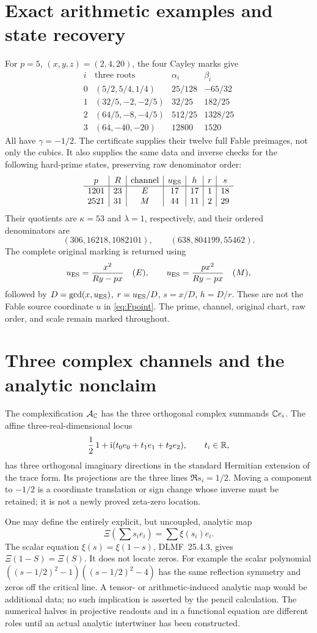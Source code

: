 \documentclass[11pt]{article}
\theoremstyle{remark}\newtheorem{remark}[theorem]{Remark}
\begin{document}
\section{Exact arithmetic examples and state recovery}
For $p=5$, $(x,y,z)=(2,4,20)$, the four Cayley marks give
\[
\begin{array}{c|c|c|c}
i&\text{three roots}&\alpha_i&\beta_i\\\hline
0&(5/2,5/4,1/4)&25/128&-65/32\\
1&(32/5,-2,-2/5)&32/25&182/25\\
2&(64/5,-8,-4/5)&512/25&1328/25\\
3&(64,-40,-20)&12800&1520
\end{array}
\]
All have $\gamma=-1/2$. The certificate supplies their twelve full Fable preimages, not only the cubics. It also supplies the same data and inverse checks for the following hard-prime states, preserving raw denominator order:
\[
\begin{array}{c|c|c|c|c|c|c}
p&R&\text{channel}&u_{\rm ES}&h&r&s\\\hline
1201&23&E&17&17&1&18\\
2521&31&M&44&11&2&29
\end{array}
\]
Their quotients are $\kappa=53$ and $\lambda=1$, respectively, and their ordered denominators are
\[
 (306,16218,1082101),\qquad(638,804199,55462).
\]
The complete original marking is returned using
\[
 u_{\rm ES}=\frac{x^2}{Ry-px}\quad(E),\qquad
 u_{\rm ES}=\frac{px^2}{Ry-px}\quad(M),
\]
followed by $D=\gcd(x,u_{\rm ES})$, $r=u_{\rm ES}/D$, $s=x/D$, $h=D/r$.
These are not the Fable source coordinate $u$ in \eqref{eq:Fpoint}.
The prime, channel, original chart, raw order, and scale remain marked throughout.

\section{Three complex channels and the analytic nonclaim}
The complexification $\mathcal A_\mathbb C$ has the three orthogonal complex summands $\mathbb C e_i$. The affine three-real-dimensional locus
\[
 \frac12\,1+\mathrm i(t_0e_0+t_1e_1+t_2e_2),\qquad t_i\in\mathbb R,
\]
has three orthogonal imaginary directions in the standard Hermitian extension of the trace form. Its projections are the three lines $\Re s_i=1/2$. Moving a component to $-1/2$ is a coordinate translation or sign change whose inverse must be retained; it is not a newly proved zeta-zero location.

One may define the entirely explicit, but uncoupled, analytic map
\[
 \Xi\left(\sum s_ie_i\right)=\sum \xi(s_i)e_i.
\]
The scalar equation $\xi(s)=\xi(1-s)$, DLMF~25.4.3, gives $\Xi(1-S)=\Xi(S)$. It does not locate zeros. For example the scalar polynomial $((s-1/2)^2-1)((s-1/2)^2-4)$ has the same reflection symmetry and zeros off the critical line. A tensor- or arithmetic-induced analytic map would be additional data; no such implication is asserted by the pencil calculation. The numerical halves in projective readouts and in a functional equation are different roles until an actual analytic intertwiner has been constructed.
\end{document}
